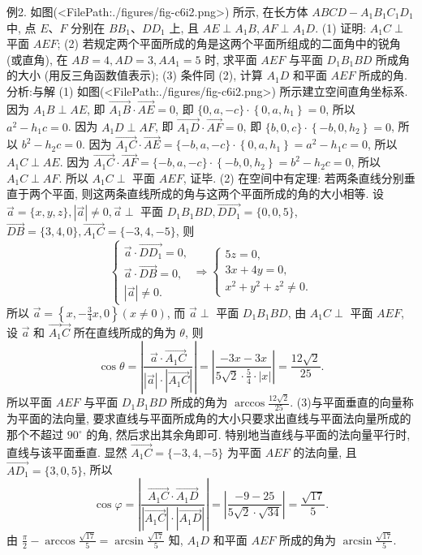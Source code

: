 例2. 如图(<FilePath:./figures/fig-c6i2.png>) 所示, 在长方体 $A B C D-A_1 B_1 C_1 D_1$ 中, 点 $E 、 F$ 分别在 $B B_1 、 D D_1$ 上, 且 $A E \perp A_1 B, A F \perp A_1 D$.
(1) 证明: $A_1 C \perp$ 平面 $A E F$;
(2) 若规定两个平面所成的角是这两个平面所组成的二面角中的锐角 (或直角), 在 $A B=4, A D=3, A A_1=5$ 时, 求平面 $A E F$ 与平面 $D_1 B_1 B D$ 所成角的大小 (用反三角函数值表示);
(3) 条件同 (2), 计算 $A_1 D$ 和平面 $A E F$ 所成的角.
分析:与解 (1) 如图(<FilePath:./figures/fig-c6i2.png>) 所示建立空间直角坐标系.
因为 $A_1 B \perp A E$, 即 $\overrightarrow{A_1 B} \cdot \overrightarrow{A E}=0$, 即 $\{0, a,-c\} \cdot \left\{0, a, h_1\right\}=0$, 所以 $a^2-h_1 c=0$.
因为 $A_1 D \perp A F$, 即 $\overrightarrow{A_1 D} \cdot \overrightarrow{A F}=0$, 即 $\{b, 0, c\} \cdot\left\{-b, 0, h_2\right\}=0$, 所以 $b^2-h_2 c=0$.
因为 $\overrightarrow{A_1 C} \cdot \overrightarrow{A E}=\{-b, a,-c\} \cdot\left\{0, a, h_1\right\}=a^2-h_1 c=0$, 所以 $A_1 C \perp A E$.
因为 $\overrightarrow{A_1 C} \cdot \overrightarrow{A F}=\{-b, a,-c\} \cdot\left\{-b, 0, h_2\right\}=b^2-h_2 c=0$, 所以 $A_1 C \perp A F$.
所以 $A_1 C \perp$ 平面 $A E F$, 证毕.
(2) 在空间中有定理: 若两条直线分别垂直于两个平面, 则这两条直线所成的角与这两个平面所成的角的大小相等.
设 $\vec{a}=\{x, y, z\},|\vec{a}| \neq 0, \vec{a} \perp$ 平面 $D_1 B_1 B D, \overrightarrow{D D_1}=\{0,0,5\}$, $\overrightarrow{D B}=\{3,4,0\}, \overrightarrow{A_1 C}=\{-3,4,-5\}$, 则
$$
\left\{\begin{array} { l } 
{ \vec { a } \cdot \vec { D D _ { 1 } } = 0 , } \\
{ \vec { a } \cdot \vec { D B } = 0 , } \\
{ | \vec { a } | \neq 0 . }
\end{array} \Rightarrow \left\{\begin{array}{l}
5 z=0, \\
3 x+4 y=0, \\
x^2+y^2+z^2 \neq 0 .
\end{array}\right.\right.
$$
所以 $\vec{a}=\left\{x,-\frac{3}{4} x, 0\right\}(x \neq 0)$, 而 $\vec{a} \perp$ 平面 $D_1 B_1 B D$, 由 $A_1 C \perp$ 平面 $A E F$, 设 $\vec{a}$ 和 $\overrightarrow{A_1} \vec{C}$ 所在直线所成的角为 $\theta$, 则
$$
\cos \theta=\left|\frac{\vec{a} \cdot \overrightarrow{A_1 C}}{|\vec{a}| \cdot\left|\overrightarrow{A_1 C}\right|}\right|=\left|\frac{-3 x-3 x}{5 \sqrt{2} \cdot \frac{5}{4} \cdot|x|}\right|=\frac{12 \sqrt{2}}{25} .
$$
所以平面 $A E F$ 与平面 $D_1 B_1 B D$ 所成的角为 $\arccos \frac{12 \sqrt{2}}{25}$.
(3)与平面垂直的向量称为平面的法向量, 要求直线与平面所成角的大小只要求出直线与平面法向量所成的那个不超过 $90^{\circ}$ 的角, 然后求出其余角即可.
特别地当直线与平面的法向量平行时,直线与该平面垂直.
显然 $\overrightarrow{A_1 C}=\{-3,4,-5\}$ 为平面 $A E F$ 的法向量, 且 $\overrightarrow{A D_1}=\{3,0,5\}$, 所以
$$
\cos \varphi=\left|\frac{\overrightarrow{A_1 C} \cdot \overrightarrow{A_1 D}}{\left|\overrightarrow{A_1 C}\right| \cdot\left|\overrightarrow{A_1 D}\right|}\right|=\left|\frac{-9-25}{5 \sqrt{2} \cdot \sqrt{34}}\right|=\frac{\sqrt{17}}{5} .
$$
由 $\frac{\pi}{2}-\arccos \frac{\sqrt{17}}{5}=\arcsin \frac{\sqrt{17}}{5}$ 知, $A_1 D$ 和平面 $A E F$ 所成的角为 $\arcsin \frac{\sqrt{17}}{5}$.



